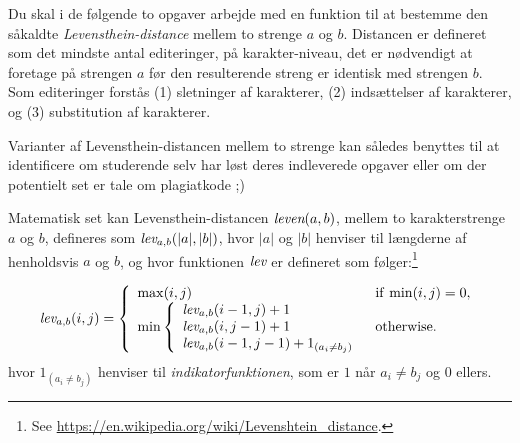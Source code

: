 Du skal i de følgende to opgaver arbejde med en funktion til at
  bestemme den såkaldte \emph{Levensthein-distance} mellem to strenge
  $a$ og $b$. Distancen er defineret som det mindste antal
  editeringer, på karakter-niveau, det er nødvendigt at foretage på
  strengen $a$ før den resulterende streng er identisk med strengen
  $b$. Som editeringer forstås (1) sletninger af karakterer, (2)
  indsættelser af karakterer, og (3) substitution af
  karakterer.

  Varianter af Levensthein-distancen mellem to strenge kan
  således benyttes til at identificere om studerende selv har løst
  deres indleverede opgaver eller om der potentielt set er tale om
  plagiatkode ;)

  Matematisk set kan Levensthein-distancen $\emph{leven}(a,b)$, mellem
  to karakterstrenge $a$ og $b$, defineres som
  $\emph{lev}_{a,b}(|a|,|b|)$, hvor $|a|$ og $|b|$ henviser til
  længderne af henholdsvis $a$ og $b$, og hvor funktionen $\emph{lev}$ er
  defineret som følger:\footnote{See
    \url{https://en.wikipedia.org/wiki/Levenshtein_distance}.}

  \[
  \emph{lev}_{a,b}(i,j) = \left \{ \begin{array}{ll} \mathrm{max}(i,j) & \mathrm{if}~\mathrm{min}(i,j) = 0, \\
    \mathrm{min} \left \{ \begin{array}{l}\emph{lev}_{a,b}(i-1,j)+1 \\
                                          \emph{lev}_{a,b}(i,j-1)+1 \\
                                          \emph{lev}_{a,b}(i-1,j-1)+1_{(a_i\not=b_j)} \end{array} \right . & \mathrm{otherwise}. \end{array} \right .
  \]
  hvor $1_{(a_i\not=b_j)}$ henviser til \emph{indikatorfunktionen}, som er $1$ når $a_i\not=b_j$ og $0$ ellers.

